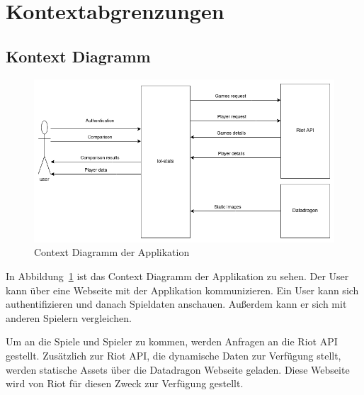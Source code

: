 \section{Kontextabgrenzungen}
\subsection{Kontext Diagramm}

\begin{figure}
    \centering
    \includegraphics[width=\textwidth]{images/03-context-diagram}
    \caption{Context Diagramm der Applikation}
    \label{fig:context-diagram}
\end{figure}

In Abbildung~\ref{fig:context-diagram} ist das Context Diagramm der Applikation zu sehen.
Der User kann über eine Webseite mit der Applikation kommunizieren.
Ein User kann sich authentifizieren und danach Spieldaten anschauen.
Außerdem kann er sich mit anderen Spielern vergleichen.

Um an die Spiele und Spieler zu kommen, werden Anfragen an die Riot API gestellt.
Zusätzlich zur Riot API, die dynamische Daten zur Verfügung stellt, werden statische Assets über die Datadragon
Webseite geladen.
Diese Webseite wird von Riot für diesen Zweck zur Verfügung gestellt.

